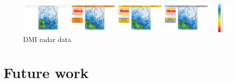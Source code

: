 \documentclass[11pt,a4paper]{article}
\begin{document}
\begin{figure}[htbp]
    \centering
    \includegraphics[width=1.2\textwidth]{../PLOTS/panel_Accpcp3h_202401030000+24.png}
    \caption{DMI radar data}
    \label{fig:TPexample1}
\end{figure}
%
%
%

\section{Future work}







\end{document}
